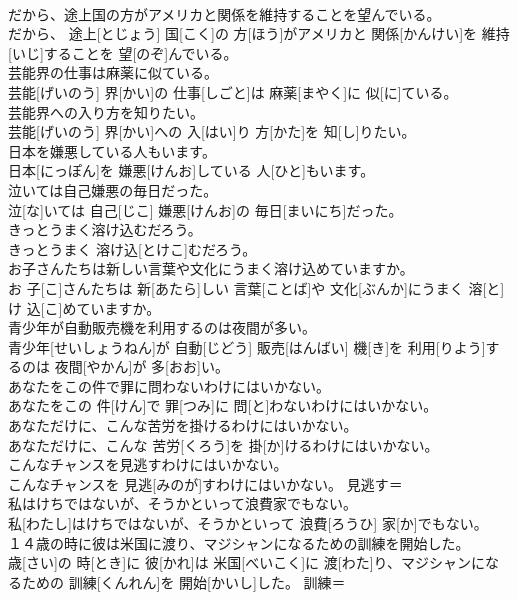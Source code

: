 \documentclass[8pt]{extreport}
\begin{document}
\begin{CJK}{UTF8}{min}
\\	だから、途上国の方がアメリカと関係を維持することを望んでいる。	
\\	だから、 途上[とじょう] 国[こく]の 方[ほう]がアメリカと 関係[かんけい]を 維持[いじ]することを 望[のぞ]んでいる。	
\\	芸能界の仕事は麻薬に似ている。	
\\	芸能[げいのう] 界[かい]の 仕事[しごと]は 麻薬[まやく]に 似[に]ている。	
\\	芸能界への入り方を知りたい。	
\\	芸能[げいのう] 界[かい]への 入[はい]り 方[かた]を 知[し]りたい。	
\\	日本を嫌悪している人もいます。	
\\	日本[にっぽん]を 嫌悪[けんお]している 人[ひと]もいます。	
\\	泣いては自己嫌悪の毎日だった。	
\\	泣[な]いては 自己[じこ] 嫌悪[けんお]の 毎日[まいにち]だった。	
\\	きっとうまく溶け込むだろう。	
\\	きっとうまく 溶け込[とけこ]むだろう。	
\\	お子さんたちは新しい言葉や文化にうまく溶け込めていますか。	
\\	お 子[こ]さんたちは 新[あたら]しい 言葉[ことば]や 文化[ぶんか]にうまく 溶[と]け 込[こ]めていますか。	
\\	青少年が自動販売機を利用するのは夜間が多い。	
\\	青少年[せいしょうねん]が 自動[じどう] 販売[はんばい] 機[き]を 利用[りよう]するのは 夜間[やかん]が 多[おお]い。	
\\	あなたをこの件で罪に問わないわけにはいかない。	
\\	あなたをこの 件[けん]で 罪[つみ]に 問[と]わないわけにはいかない。	
\\	あなただけに、こんな苦労を掛けるわけにはいかない。	
\\	あなただけに、こんな 苦労[くろう]を 掛[か]けるわけにはいかない。	
\\	こんなチャンスを見逃すわけにはいかない。	
\\	こんなチャンスを 見逃[みのが]すわけにはいかない。	見逃す＝
\\	私はけちではないが、そうかといって浪費家でもない。	
\\	私[わたし]はけちではないが、そうかといって 浪費[ろうひ] 家[か]でもない。	
\\	１４歳の時に彼は米国に渡り、マジシャンになるための訓練を開始した。	
\\	歳[さい]の 時[とき]に 彼[かれ]は 米国[べいこく]に 渡[わた]り、マジシャンになるための 訓練[くんれん]を 開始[かいし]した。	訓練＝ 

\end{CJK}
\end{document}
